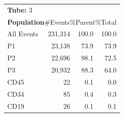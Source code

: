 \documentclass[UTF8,10pt,a4paper,fontset=fandol]{ctexart}
\newcommand{\fieldvalue}[1]{#1}
\begin{document}
\noindent
\begin{tabularx}{0.58\textwidth}{@{}lrrr@{}}
\multicolumn{4}{l}{\textbf{Tube:}
\fieldvalue{3}}\\
\multicolumn{4}{l}{\textbf{Population}\hfill \#Events\quad \%Parent\quad \%Total}\\
All Events &
\fieldvalue{231,314} &
\fieldvalue{100.0} &
\fieldvalue{100.0}\\
P1 &
\fieldvalue{23,138} &
\fieldvalue{73.9} &
\fieldvalue{73.9}\\
P2 &
\fieldvalue{22,696} &
\fieldvalue{98.1} &
\fieldvalue{72.5}\\
P3 &
\fieldvalue{20,932} &
\fieldvalue{88.3} &
\fieldvalue{64.0}\\
\quad CD45 &
\fieldvalue{22} &
\fieldvalue{0.1} &
\fieldvalue{0.0}\\
\quad CD34 &
\fieldvalue{85} &
\fieldvalue{0.4} &
\fieldvalue{0.3}\\
\quad CD19 &
\fieldvalue{26} &
\fieldvalue{0.1} &
\fieldvalue{0.1}
\end{tabularx}

\vspace{0.6em}
\end{document}
